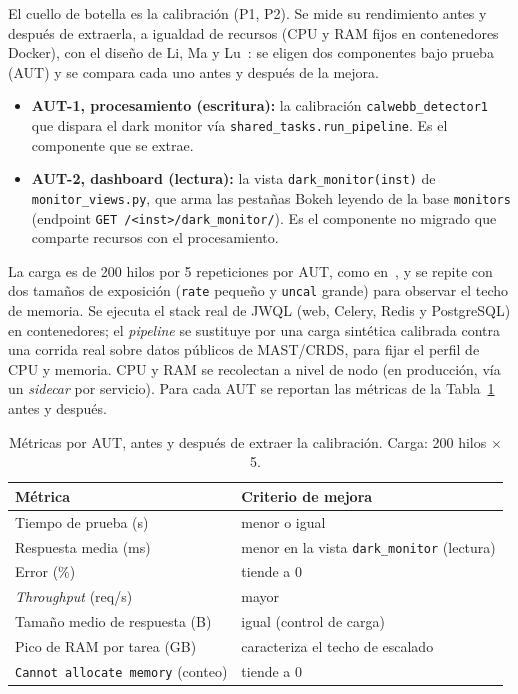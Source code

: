 \documentclass[conference]{IEEEtran}
\begin{document}
El cuello de botella es la calibraci\'on (P1, P2). Se mide su rendimiento antes y despu\'es de extraerla, a igualdad de recursos (CPU y RAM fijos en contenedores Docker), con el dise\~no de Li, Ma y Lu~\cite{lima2020}: se eligen dos componentes bajo prueba (AUT) y se compara cada uno antes y despu\'es de la mejora.

\begin{itemize}
\item \textbf{AUT-1, procesamiento (escritura):} la calibraci\'on \texttt{calwebb\_detector1} que dispara el dark monitor v\'ia \texttt{shared\_tasks.run\_pipeline}. Es el componente que se extrae.
\item \textbf{AUT-2, dashboard (lectura):} la vista \texttt{dark\_monitor(inst)} de \texttt{monitor\_views.py}, que arma las pesta\~nas Bokeh leyendo de la base \texttt{monitors} (endpoint \texttt{GET /<inst>/dark\_monitor/}). Es el componente no migrado que comparte recursos con el procesamiento.
\end{itemize}

La carga es de 200 hilos por 5 repeticiones por AUT, como en~\cite{lima2020}, y se repite con dos tama\~nos de exposici\'on (\texttt{rate} peque\~no y \texttt{uncal} grande) para observar el techo de memoria. Se ejecuta el stack real de JWQL (web, Celery, Redis y PostgreSQL) en contenedores; el \textit{pipeline} se sustituye por una carga sint\'etica calibrada contra una corrida real sobre datos p\'ublicos de MAST/CRDS, para fijar el perfil de CPU y memoria. CPU y RAM se recolectan a nivel de nodo (en producci\'on, v\'ia un \textit{sidecar} por servicio). Para cada AUT se reportan las m\'etricas de la Tabla~\ref{tab:metricas} antes y despu\'es.

\begin{table}[h]
\centering
\caption{M\'etricas por AUT, antes y despu\'es de extraer la calibraci\'on. Carga: 200 hilos $\times$ 5.}
\label{tab:metricas}
\begin{tabularx}{\columnwidth}{Xl}
\toprule
\textbf{M\'etrica} & \textbf{Criterio de mejora} \\
\midrule
Tiempo de prueba (s) & menor o igual \\
Respuesta media (ms) & menor en la vista \texttt{dark\_monitor} (lectura) \\
Error (\%) & tiende a 0 \\
\textit{Throughput} (req/s) & mayor \\
Tama\~no medio de respuesta (B) & igual (control de carga) \\
Pico de RAM por tarea (GB) & caracteriza el techo de escalado \\
\texttt{Cannot allocate memory} (conteo) & tiende a 0 \\
\bottomrule
\end{tabularx}
\end{table}
\end{document}
